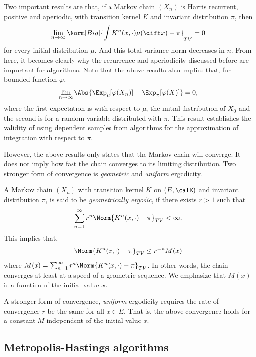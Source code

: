 Two important results are that, if a Markov chain $(X_n)$ is Harris recurrent,
positive and aperiodic, with transition kernel $K$ and invariant distribution
$\pi$, then
\begin{equation}
  \lim_{n\to\infty}\Norm[Big]{
    \int K^n(x,\cdot)\mu(\diff x) - \pi}_{TV} = 0
\end{equation}
for every initial distribution $\mu$. And this total variance norm decreases
in $n$. From here, it becomes clearly why the recurrence and aperiodicity
discussed before are important for \mcmc algorithms. Note that the above
results also implies that, for bounded function $\varphi$,
\begin{equation}
  \lim_{n\to\infty}\Abs{\Exp_{\mu}[\varphi(X_n)] - \Exp_{\pi}[\varphi(X)]}
  = 0,
\end{equation}
where the first expectation is with respect to $\mu$, the initial
distribution of $X_0$ and the second is for a random variable distributed with
$\pi$. This result establishes the validity of using dependent samples from
\mcmc algorithms for the approximation of integration with respect to $\pi$.

However, the above results only states that the Markov chain will converge. It
does not imply how fast the chain converges to its limiting distribution. Two
stronger form of convergence is \emph{geometric} and \emph{uniform}
ergodicity.

A Markov chain $(X_n)$ with transition kernel $K$ on $(E,\calE)$ and invariant
distribution $\pi$, is said to be \emph{geometrically ergodic}, if there
exists $r > 1$ such that
\begin{equation}
  \sum_{n=1}^{\infty} r^n\Norm{K^n(x,\cdot)-\pi}_{TV} <\infty.
\end{equation}
This implies that,
\begin{equation}
  \Norm{K^n(x,\cdot)-\pi}_{TV}\le r^{-n}M(x)
\end{equation}
where $M(x) = \sum_{n=1}^{\infty} r^n\Norm{K^n(x,\cdot)-\pi}_{TV}$. In other
words, the chain converges at least at a speed of a geometric sequence. We
emphasize that $M(x)$ is a function of the initial value $x$.

A stronger form of convergence, \emph{uniform} ergodicity requires the rate of
convergence $r$ be the same for all $x\in E$. That is, the above convergence
holds for a constant $M$ independent of the initial value $x$.

\subsection{Metropolis-Hastings algorithms}
\label{sub:Metropolis-Hastings algorithms}

